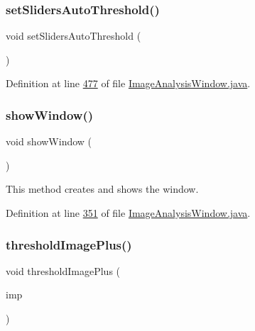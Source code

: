 \subsubsection{\texorpdfstring{set\+Sliders\+Auto\+Threshold()}{setSlidersAutoThreshold()}}
{\footnotesize\ttfamily void set\+Sliders\+Auto\+Threshold (\begin{DoxyParamCaption}{ }\end{DoxyParamCaption})\hspace{0.3cm}{\ttfamily [private]}}



Definition at line \hyperlink{_image_analysis_window_8java_source_l00477}{477} of file \hyperlink{_image_analysis_window_8java_source}{Image\+Analysis\+Window.\+java}.

\hypertarget{classgui_1_1_image_analysis_window_aae02cc4cef6bcbb0d78251146784b058}{}\label{classgui_1_1_image_analysis_window_aae02cc4cef6bcbb0d78251146784b058} 
\subsubsection{\texorpdfstring{show\+Window()}{showWindow()}}
{\footnotesize\ttfamily void show\+Window (\begin{DoxyParamCaption}{ }\end{DoxyParamCaption})}

This method creates and shows the window. 

Definition at line \hyperlink{_image_analysis_window_8java_source_l00351}{351} of file \hyperlink{_image_analysis_window_8java_source}{Image\+Analysis\+Window.\+java}.

\hypertarget{classgui_1_1_image_analysis_window_a4d06082b25cf59e18ad8de7e5969b863}{}\label{classgui_1_1_image_analysis_window_a4d06082b25cf59e18ad8de7e5969b863} 
\subsubsection{\texorpdfstring{threshold\+Image\+Plus()}{thresholdImagePlus()}}
{\footnotesize\ttfamily void threshold\+Image\+Plus (\begin{DoxyParamCaption}\item[{Image\+Plus}]{imp }\end{DoxyParamCaption})}

